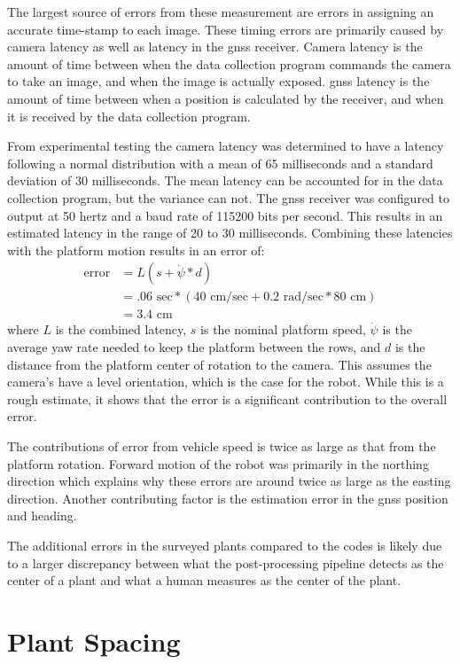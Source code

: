 The largest source of errors from these measurement are errors in assigning an accurate time-stamp to each image.  These timing errors are primarily caused by camera latency as well as latency in the \ac{gnss} receiver.  Camera latency is the amount of time between when the data collection program commands the camera to take an image, and when the image is actually exposed.  \ac{gnss} latency is the amount of time between when a position is calculated by the receiver, and when it is received by the data collection program. 

From experimental testing the camera latency was determined to have a latency following a normal distribution with a mean of 65 milliseconds and a standard deviation of 30 milliseconds.  The mean latency can be accounted for in the data collection program, but the variance can not. The \ac{gnss} receiver was configured to output at 50 hertz and a baud rate of 115200 bits per second.  This results in an estimated latency in the range of 20 to 30 milliseconds.  Combining these latencies with the platform motion results in an error of:
\begin{align*}
 \text{error} &= L (s + \dot{\psi}*d) \\
             &= .06 \text{ sec}* (40\text{ cm/sec} + 0.2 \text{ rad/sec} * 80 \text{ cm}) \\ 
             &= 3.4 \text{ cm}
\end{align*}
where $L$ is the combined latency, $s$ is the nominal platform speed, $\dot{\psi}$ is the average yaw rate needed to keep the platform between the rows, and $d$ is the distance from the platform center of rotation to the camera.  This assumes the camera's have a level orientation, which is the case for the robot.  While this is a rough estimate, it shows that the error is a significant contribution to the overall error.

The contributions of error from vehicle speed is twice as large as that from the platform rotation. Forward motion of the robot was primarily in the northing direction which explains why these errors are around twice as large as the easting direction.  Another contributing factor is the estimation error in the \ac{gnss} position and heading.

The additional errors in the surveyed plants compared to the codes is likely due to a larger discrepancy between what the post-processing pipeline detects as the center of a plant and what a human measures as the center of the plant. 

\section{Plant Spacing}

